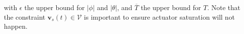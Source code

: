 \documentclass[journal,10pt]{IEEEtran}
\newcommand{\vect}[1]{\boldsymbol{\mathbf{#1}}}
\newcommand{\mat}[1]{\begin{bmatrix} #1 \end{bmatrix}}
\newcommand{\sat}{\mbox{sat}}
\newif\ifdraft
\newcommand{\VF}[1]{\ifdraft{\color{blue}[{\bf VF}: #1]}\fi}
\begin{document}
with $\epsilon$ the upper bound for $|\phi|$ and $|\theta|$, and $\overline{T}$ the upper bound for $T$. Note that the constraint $\vect{v}_s(t)\in\mathcal{V}$ is important to ensure actuator saturation will not happen.


\end{document}
